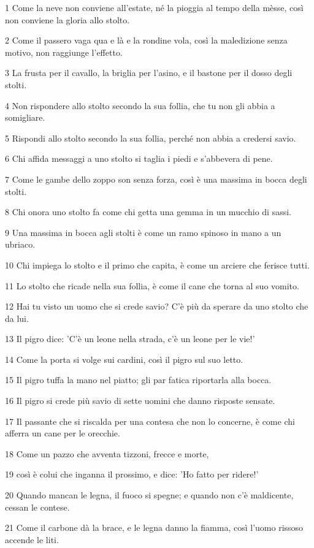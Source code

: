 \par 1 Come la neve non conviene all'estate, né la pioggia al tempo della mèsse, così non conviene la gloria allo stolto.
\par 2 Come il passero vaga qua e là e la rondine vola, così la maledizione senza motivo, non raggiunge l'effetto.
\par 3 La frusta per il cavallo, la briglia per l'asino, e il bastone per il dosso degli stolti.
\par 4 Non rispondere allo stolto secondo la sua follia, che tu non gli abbia a somigliare.
\par 5 Rispondi allo stolto secondo la sua follia, perché non abbia a credersi savio.
\par 6 Chi affida messaggi a uno stolto si taglia i piedi e s'abbevera di pene.
\par 7 Come le gambe dello zoppo son senza forza, così è una massima in bocca degli stolti.
\par 8 Chi onora uno stolto fa come chi getta una gemma in un mucchio di sassi.
\par 9 Una massima in bocca agli stolti è come un ramo spinoso in mano a un ubriaco.
\par 10 Chi impiega lo stolto e il primo che capita, è come un arciere che ferisce tutti.
\par 11 Lo stolto che ricade nella sua follia, è come il cane che torna al suo vomito.
\par 12 Hai tu visto un uomo che si crede savio? C'è più da sperare da uno stolto che da lui.
\par 13 Il pigro dice: 'C'è un leone nella strada, c'è un leone per le vie!'
\par 14 Come la porta si volge sui cardini, così il pigro sul suo letto.
\par 15 Il pigro tuffa la mano nel piatto; gli par fatica riportarla alla bocca.
\par 16 Il pigro si crede più savio di sette uomini che danno risposte sensate.
\par 17 Il passante che si riscalda per una contesa che non lo concerne, è come chi afferra un cane per le orecchie.
\par 18 Come un pazzo che avventa tizzoni, frecce e morte,
\par 19 così è colui che inganna il prossimo, e dice: 'Ho fatto per ridere!'
\par 20 Quando mancan le legna, il fuoco si spegne; e quando non c'è maldicente, cessan le contese.
\par 21 Come il carbone dà la brace, e le legna danno la fiamma, così l'uomo rissoso accende le liti.
